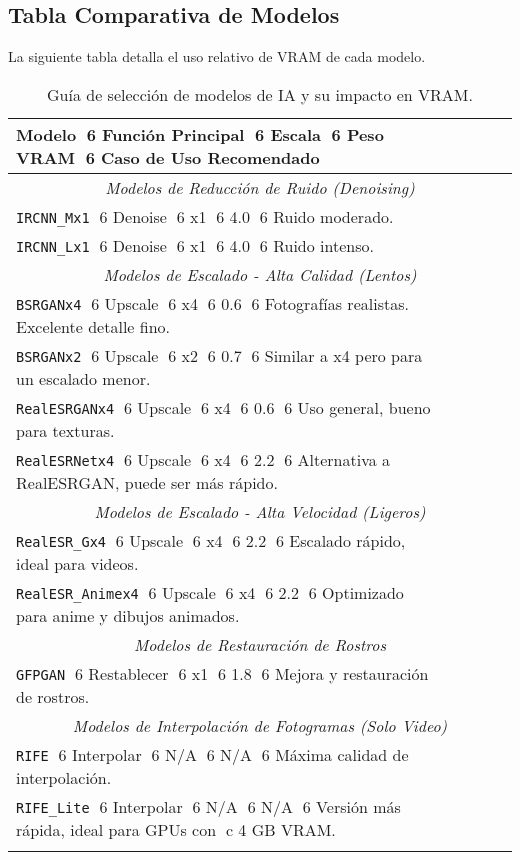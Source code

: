 \documentclass[11pt, a4paper]{article}
\begin{document}
\subsection{Tabla Comparativa de Modelos}
La siguiente tabla detalla el uso relativo de VRAM de cada modelo.
\begin{longtable}{l l c c p{6.5cm}}
\toprule
\textbf{Modelo} 6 \textbf{Función Principal} 6 \textbf{Escala} 6 \textbf{Peso VRAM} 6 \textbf{Caso de Uso Recomendado} \\
\midrule
\endhead %

\multicolumn{5}{c}{\textit{Modelos de Reducción de Ruido (Denoising)}} \\
\midrule
\texttt{IRCNN\_Mx1} 6 Denoise 6 x1 6 4.0 6 Ruido moderado. \\
\texttt{IRCNN\_Lx1} 6 Denoise 6 x1 6 4.0 6 Ruido intenso. \\
\midrule
\multicolumn{5}{c}{\textit{Modelos de Escalado - Alta Calidad (Lentos)}} \\
\midrule
\texttt{BSRGANx4} 6 Upscale 6 x4 6 0.6 6 Fotografías realistas. Excelente detalle fino. \\
\texttt{BSRGANx2} 6 Upscale 6 x2 6 0.7 6 Similar a x4 pero para un escalado menor. \\
\texttt{RealESRGANx4} 6 Upscale 6 x4 6 0.6 6 Uso general, bueno para texturas. \\
\texttt{RealESRNetx4} 6 Upscale 6 x4 6 2.2 6 Alternativa a RealESRGAN, puede ser más rápido. \\
\midrule
\multicolumn{5}{c}{\textit{Modelos de Escalado - Alta Velocidad (Ligeros)}} \\
\midrule
\texttt{RealESR\_Gx4} 6 Upscale 6 x4 6 2.2 6 Escalado rápido, ideal para videos. \\
\texttt{RealESR\_Animex4} 6 Upscale 6 x4 6 2.2 6 Optimizado para anime y dibujos animados. \\
\midrule
\multicolumn{5}{c}{\textit{Modelos de Restauración de Rostros}} \\
\midrule
\texttt{GFPGAN} 6 Restablecer 6 x1 6 1.8 6 Mejora y restauración de rostros. \\
\midrule
\multicolumn{5}{c}{\textit{Modelos de Interpolación de Fotogramas (Solo Video)}} \\
\midrule
\texttt{RIFE} 6 Interpolar 6 N/A 6 N/A 6 Máxima calidad de interpolación. \\
\texttt{RIFE\_Lite} 6 Interpolar 6 N/A 6 N/A 6 Versión más rápida, ideal para GPUs con c 4 GB VRAM. \\
\bottomrule
\caption{Guía de selección de modelos de IA y su impacto en VRAM.}
\label{tab:modelos} %
\end{longtable}
\end{document}
